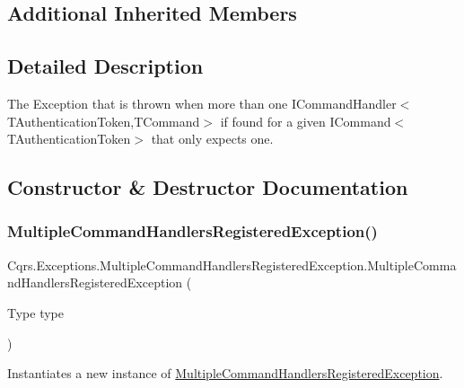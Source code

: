 \subsection*{Additional Inherited Members}


\subsection{Detailed Description}
The Exception that is thrown when more than one I\+Command\+Handler$<$\+T\+Authentication\+Token,\+T\+Command$>$ if found for a given I\+Command$<$\+T\+Authentication\+Token$>$ that only expects one. 



\subsection{Constructor \& Destructor Documentation}
\mbox{\label{classCqrs_1_1Exceptions_1_1MultipleCommandHandlersRegisteredException_aa8e0bffc3404b091301abaec4c770aa6_aa8e0bffc3404b091301abaec4c770aa6}} 
\subsubsection{\texorpdfstring{Multiple\+Command\+Handlers\+Registered\+Exception()}{MultipleCommandHandlersRegisteredException()}\hspace{0.1cm}{\footnotesize\ttfamily [1/2]}}
{\footnotesize\ttfamily Cqrs.\+Exceptions.\+Multiple\+Command\+Handlers\+Registered\+Exception.\+Multiple\+Command\+Handlers\+Registered\+Exception (\begin{DoxyParamCaption}\item[{Type}]{type }\end{DoxyParamCaption})}



Instantiates a new instance of \hyperlink{classCqrs_1_1Exceptions_1_1MultipleCommandHandlersRegisteredException}{Multiple\+Command\+Handlers\+Registered\+Exception}. 



